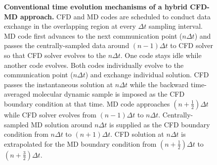 \documentclass[preprint,12pt]{elsarticle}
\begin{document}
\begin{figure}
\centering
{}
\vskip-0.2cm
\caption[]{\small {\bf Conventional time evolution mechanisms of a hybrid CFD-MD approach.} 
CFD and MD codes are scheduled to conduct data exchange in the overlapping 
region at every $\Delta{t}$ sampling interval.
 MD code first advances to the next communication
point ($n{\Delta}t$) and passes the centrally-sampled data around
$(n-1){\Delta}t$ to CFD solver so that CFD solver evolves to the $n{\Delta}t$.
One code stays idle while another code evolves.
 Both codes individually evolve to the communication
point ($n{\Delta}t$) and exchange individual solution.
CFD passes the instantaneous solution at $n{\Delta}t$ while
the backward time-averaged molecular dynamic sample is imposed as the
CFD boundary condition at that time.
 MD code approaches $(n+\frac{1}{2}){\Delta}t$ while
CFD solver evolves from $(n-1){\Delta}t$ to $n{\Delta}t$. Centrally-sampled MD solution
around $n{\Delta}t$ is supplied as the CFD boundary condition
from $n{\Delta}t$ to $(n+1){\Delta}t$. CFD solution at $n{\Delta}t$ is extrapolated
for the MD boundary condition from $(n+\frac{1}{2}){\Delta}t$ to $(n+\frac{3}{2}){\Delta}t$.}
\label{Hybrid_Timescale1}
\end{figure}
\end{document}
